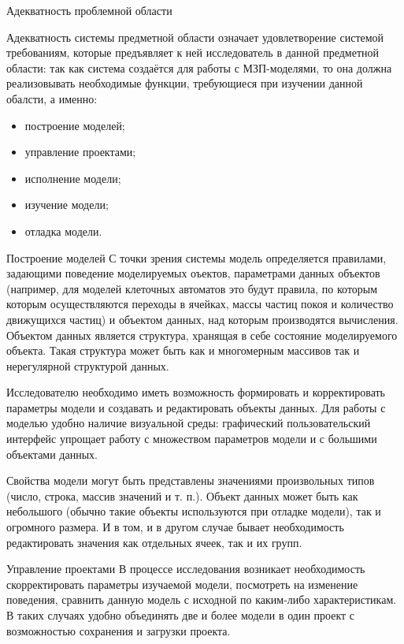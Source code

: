 \documentclass[a4paper,12pt]{extarticle}
\begin{document}
\begin{subsection}{Адекватность проблемной области}
    \label{sec:requirements-adequacy}

    Адекватность системы предметной области означает удовлетворение системой требованиям, которые предъявляет к ней исследователь в данной предметной области: так как система создаётся для работы с МЗП-моделями, то она должна реализовывать необходимые функции, требующиеся при изучении данной обалсти, а именно:
    \begin{itemize}
        \item построение моделей;
        \item управление проектами;
        \item исполнение модели;
        \item изучение модели;
        \item отладка модели.
    \end{itemize}

    \begin{subsubsection}{Построение моделей}
        С точки зрения системы модель определяется правилами, задающими поведение моделируемых оъектов, параметрами данных объектов (например, для моделей клеточных автоматов это будут правила, по которым которым осуществляются переходы в ячейках, массы частиц покоя и количество движущихся частиц) и объектом данных, над которым производятся вычисления. Объектом данных является структура, хранящая в себе состояние моделируемого объекта. Такая структура может быть как и многомерным массивов так и нерегулярной структурой данных.
        
        Исследователю необходимо иметь возможность формировать и корректировать параметры модели и создавать и редактировать объекты данных. Для работы с моделью удобно наличие визуальной среды: графический пользовательский интерфейс упрощает работу с множеством параметров модели и с большими объектами данных.
        
        Свойства модели могут быть представлены значениями произвольных типов (число, строка, массив значений и т. п.). Объект данных может быть как небольшого (обычно такие объекты используются при отладке модели), так и огромного размера. И в том, и в другом случае бывает необходимость редактировать значения как отдельных ячеек, так и их групп.
    \end{subsubsection}
        
    \begin{subsubsection}{Управление проектами}
        В процессе исследования возникает необходимость скорректировать параметры изучаемой модели, посмотреть на изменение поведения, сравнить данную модель с исходной по каким-либо характеристикам. В таких случаях удобно объединять две и более модели в один проект с возможностью сохранения и загрузки проекта. 
        

\end{subsubsection}
\end{subsection}
\end{document}
